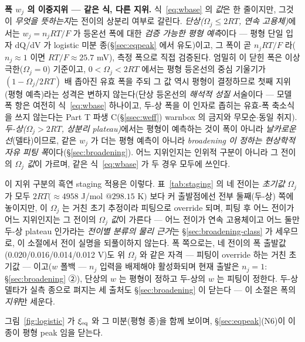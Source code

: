 \textbf{폭 $w_j$ 의 이중지위 --- 같은 식, 다른 지위.} 식~\eqref{eq:wbase} 의 \emph{값}은 한 줄이지만, 그것이
\emph{무엇을 뜻하는지}는 전이의 상분리 여부로 갈린다. \emph{단상($\Omega_j\le2RT$, 연속 고용체)}에서는 $w_j=n_jRT/F$
가 등온선 폭에 대한 \emph{검증 가능한 평형 예측}이다 --- 평형 단일 입자 dQ/dV 가 logistic
미분 종(\S\ref{sec:eqpeak} 에서 유도)이고, 그 폭이 곧 $n_jRT/F$ 라($n_j\!\approx\!1$ 이면 $RT/F\!\approx\!25.7$ mV), 측정 폭으로 직접 검증된다. 엄밀히 이 닫힌 폭은 이상 극한($\Omega_j=0$) 기준이고,
$0<\Omega_j<2RT$ 에서는 평형 등온선의 중심 기울기가 $(1-\Omega_j/2RT)$ 배 좁아진 유효 폭을 주되 그
값 역시 평형이 결정하므로 첫째 지위(평형 예측)라는 성격은 변하지 않는다(단상 등온선의 \emph{해석적 성질}
서술이다 --- 모델 폭 항은 여전히 식~\eqref{eq:wbase} 하나이고, 두-상 폭을 이 인자로 좁히는 유효-폭
축소식을 쓰지 않는다는 Part T 파생 C(\S\ref{ssec:weff}) warnbox 의 금지와 무모순$\cdot$동일 취지).
\emph{두-상($\Omega_j>2RT$, 상분리 plateau)}에서는 평형이 예측하는 것이 폭이 아니라 \emph{날카로운 선}(델타)이므로,
같은 $w_j$ 가 더는 평형 예측이 아니라 \emph{broadening 이 정하는 현상학적 자유 피팅 폭}이다(\S\ref{sec:broadening}).
어느 지위인지는 인위적 구분이 아니라 그 전이의 \emph{$\Omega_j$ 값}이 가르며, 같은 식~\eqref{eq:wbase} 가 두 경우 모두에
쓰인다.

이 지위 구분의 흑연 staging 적용은 이렇다. 표~\ref{tab:staging} 의 네 전이는 \emph{초기값} $\Omega_j$ 가 모두 $2RT(\!\approx\!4958$ J/mol
$@298.15$ K$)$ 보다 커 출발점에선 전부 둘째(두-상) 쪽에 놓이지만, 이 $\Omega_j$ 는 거친 초기 추정이라 피팅으로
override 되며, 피팅 후 어느 전이가 어느 지위인지는 그 전이의 \emph{$\Omega_j$ 값}이 가른다 --- 어느 전이가
연속 고용체이고 어느 둘만 두-상 plateau 인가라는 \emph{전이별 분류의 물리 근거}는 \S\ref{sec:broadening-class} 가
세우므로, 이 소절에서 전이 실명을 되풀이하지 않는다. 폭 쪽으로는, 네 전이의 폭 출발값(0.020/0.016/0.014/0.012 V)도 위 $\Omega_j$ 와 같은 자격 --- 피팅이
override 하는 거친 초기값 --- 이고($w$ 폴백 --- $n_j$ 입력을
배제해야 활성화되며 현재 출발은 $n_j{=}1$: \S\ref{sec:broadening} ②), 단상의 $w$ 는 평형이
정하고 두-상의 $w$ 는 피팅이 정한다. 두-상 델타가 실측 종으로 펴지는 세 출처도 \S\ref{sec:broadening} 이 닫는다 --- 이 소절은 폭의 \emph{지위}만 세운다.

그림~\ref{fig:logistic} 가 $\xi_{\mathrm{eq}}$ 와 그 미분(평형 종)을 함께 보이며, \S\ref{sec:eqpeak}(N6)이 이 종이 평형 peak 임을 닫는다.

